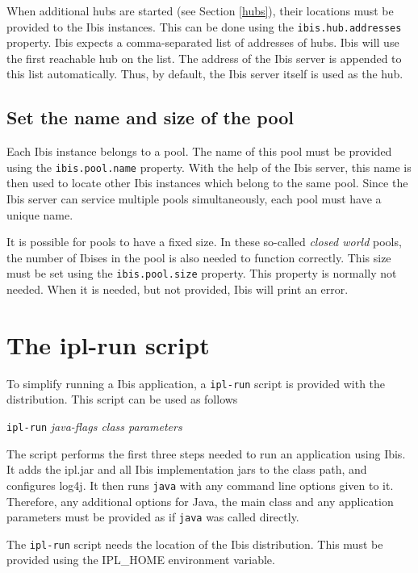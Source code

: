 \documentclass[a4paper,10pt]{article}
\begin{document}
When additional hubs are started (see Section \ref{hubs}), their locations 
must be provided to the Ibis instances. This can be done using 
the \texttt{ibis.hub.addresses} property. Ibis expects a comma-separated
list of addresses of hubs. Ibis will use the first reachable hub on the
list. The address of the Ibis server is appended to this list
automatically. Thus, by default, the Ibis server itself is used as the
hub.

\subsection{Set the name and size of the pool}

Each Ibis instance belongs to a pool. The name of this pool must be provided 
using the \texttt{ibis.pool.name} property. With the help of the Ibis server, 
this name is then used to locate other Ibis instances which belong to the
same pool. Since the Ibis server can service multiple pools simultaneously, 
each pool must have a unique name.

It is possible for pools to have a fixed size. In these so-called \emph{closed
world} pools, the number of Ibises in the pool is also needed to function 
correctly. This size must be set using the \texttt{ibis.pool.size} property. 
This property is normally not needed. When it is needed, but not provided, Ibis 
will print an error.

\section{The ipl-run script}

To simplify running a Ibis application, a \texttt{ipl-run} script is
provided with the distribution. This script can be
used as follows

\begin{center}
\texttt{ipl-run} \emph{java-flags class parameters}
\end{center}

The script performs the first three steps needed to run an application
using Ibis. It adds the ipl.jar and all Ibis implementation jars to the
class path, and configures log4j. It then runs \texttt{java} with any
command line options given to it. Therefore, any additional options for 
Java, the main class and any application parameters must be provided as 
if \texttt{java} was called directly.

The \texttt{ipl-run} script needs the location of the Ibis
distribution. This must be provided using the IPL\_HOME environment
variable.
\end{document}
